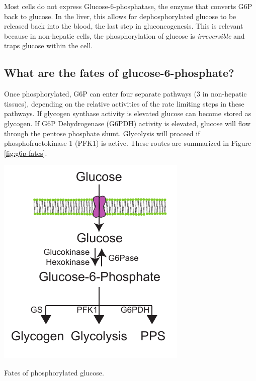 \documentclass{tufte-handout}
\begin{document}
  Most cells do not express Glucose-6-phosphatase, the enzyme that converts G6P back to glucose.  In the liver, this allows for dephosphorylated glucose to be released back into the blood, the last step in gluconeogenesis.  This is relevant because in non-hepatic cells, the phosphorylation of glucose is \emph{irreversible} and traps glucose within the cell.

\subsection{What are the fates of glucose-6-phosphate?}

Once phosphorylated, G6P can enter four separate pathways (3 in non-hepatic tissues), depending on the relative activities of the rate limiting steps in these pathways.  If glycogen synthase activity is elevated glucose can become stored as glycogen.  If G6P Dehydrogenase (G6PDH) activity is elevated, glucose will flow through the pentose phosphate shunt.  Glycolysis will proceed if phosphofructokinase-1 (PFK1) is active.  These routes are summarized in Figure \ref{fig:g6p-fates}.

\begin{marginfigure}
\includegraphics{figures/g6p-fates.pdf}
\caption{Fates of phosphorylated glucose.}
\label{fig:g6p-fates}
\end{marginfigure}
\end{document}
